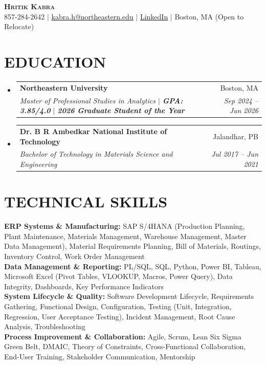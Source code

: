 \documentclass[letterpaper,10pt]{article}
\makeatletter
\newcommand{\resumeSubheading}[4]{\vspace{3pt}\item\begin{tabular*}{0.97\textwidth}[t]{l@{\extracolsep{\fill}}r}\textbf{#1} & #2 \\\textit{\small#3} & \textit{\small #4}\\\end{tabular*}\vspace{-4pt}}
\newcommand{\resumeSubHeadingListStart}{\begin{itemize}[leftmargin=0.15in, label={}]}
\newcommand{\resumeSubHeadingListEnd}{\end{itemize}}
\makeatother
\begin{document}
\begin{center}
\textbf{\LARGE \scshape Hritik Kabra} \\ \vspace{1pt}
\small 857-284-2642 $|$ \href{mailto:kabra.h@northeastern.edu}{\underline{kabra.h@northeastern.edu}} $|$
\href{https://www.linkedin.com/in/hritikkabra888}{\underline{LinkedIn}} $|$ Boston, MA (Open to Relocate)
\end{center}

\section{EDUCATION}
\resumeSubHeadingListStart
\resumeSubheading
{Northeastern University}{Boston, MA}
{Master of Professional Studies in Analytics $|$ \textbf{GPA: 3.85/4.0} $|$ \textbf{2026 Graduate Student of the Year}}{Sep 2024 -- Jun 2026}
\resumeSubheading
{Dr. B R Ambedkar National Institute of Technology}{Jalandhar, PB}
{Bachelor of Technology in Materials Science and Engineering}{Jul 2017 -- Jun 2021}
\resumeSubHeadingListEnd

\section{TECHNICAL SKILLS}
\begin{itemize}[leftmargin=0.15in, label={}]
\small{\item{
\textbf{ERP Systems \& Manufacturing:} SAP S/4HANA (Production Planning, Plant Maintenance, Materials Management, Warehouse Management, Master Data Management), Material Requirements Planning, Bill of Materials, Routings, Inventory Control, Work Order Management \\[3pt]
\textbf{Data Management \& Reporting:} PL/SQL, SQL, Python, Power BI, Tableau, Microsoft Excel (Pivot Tables, VLOOKUP, Macros, Power Query), Data Integrity, Dashboards, Key Performance Indicators \\[3pt]
\textbf{System Lifecycle \& Quality:} Software Development Lifecycle, Requirements Gathering, Functional Design, Configuration, Testing (Unit, Integration, Regression, User Acceptance Testing), Incident Management, Root Cause Analysis, Troubleshooting \\[3pt]
\textbf{Process Improvement \& Collaboration:} Agile, Scrum, Lean Six Sigma Green Belt, DMAIC, Theory of Constraints, Cross-Functional Collaboration, End-User Training, Stakeholder Communication, Mentorship
}}
\end{itemize}
\end{document}
